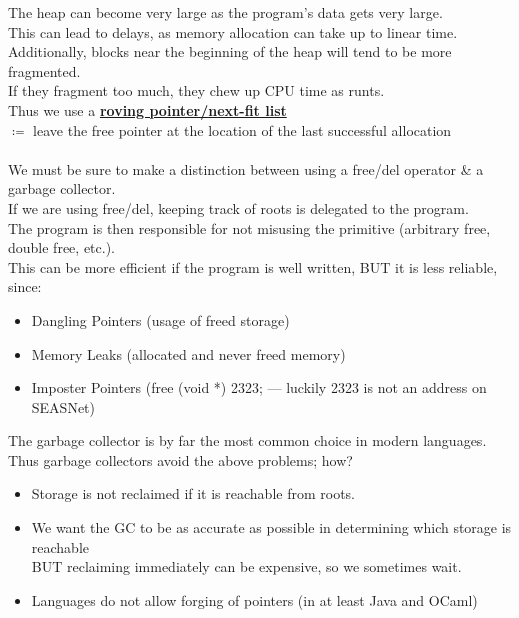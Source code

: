 \documentclass[../../lecture_notes.tex]{subfiles}
\begin{document}
\noindent The heap can become very large as the program’s data gets very large.\\
This can lead to delays, as memory allocation can take up to linear time.\\
Additionally, blocks near the beginning of the heap will tend to be more fragmented.\\
\indent If they fragment too much, they chew up CPU time as runts.\\
Thus we use a \textbf{\underline{roving pointer/next-fit list}}\\
	\indent $\coloneqq$ leave the free pointer at the location of the last successful allocation\\
\\
We must be sure to make a distinction between using a free/del operator \& a garbage collector.\\
If we are using free/del, keeping track of roots is delegated to the program.\\
The program is then responsible for not misusing the primitive (arbitrary free, double free, etc.).\\
This can be more efficient if the program is well written, BUT it is less reliable, since: \begin{itemize} [itemsep=0mm]
		\item Dangling Pointers (usage of freed storage)
		\item Memory Leaks (allocated and never freed memory)
		\item Imposter Pointers (free (void *) 2323; — luckily 2323 is not an address on SEASNet)
	\end{itemize}
The garbage collector is by far the most common choice in modern languages.\\
Thus garbage collectors avoid the above problems; how? \begin{itemize} [itemsep=0mm]
	\item Storage is not reclaimed if it is reachable from roots.
	\item We want the GC to be as accurate as possible in determining which storage is reachable\\
	        BUT reclaiming immediately can be expensive, so we sometimes wait.
	\item Languages do not allow forging of pointers (in at least Java and OCaml)
\end{itemize} \smallskip
\end{document}
